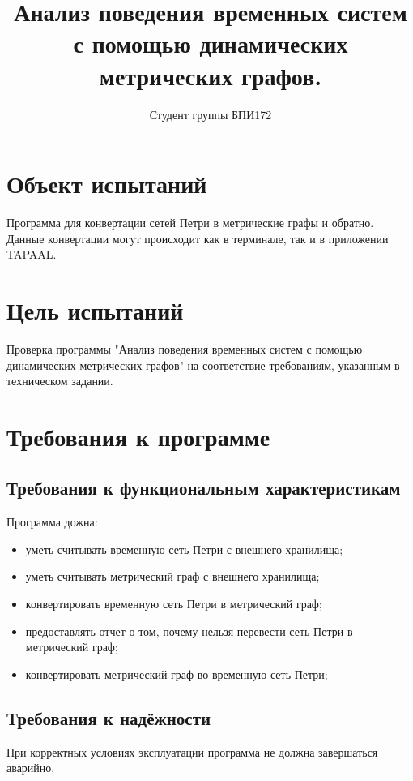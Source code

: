 \documentclass{../TechDoc}
\title{Анализ поведения временных систем с помощью динамических метрических графов.}
\author{Студент группы БПИ172}{А. А. Измайлов}
\begin{document}
	\maketitle
	\tableofcontents
	
	\section{Объект испытаний}
	Программа для конвертации сетей Петри в метрические графы и обратно. Данные конвертации могут происходит как в терминале, так и в приложении TAPAAL.
	
	\section{Цель испытаний}
	Проверка программы "Анализ поведения временных систем с помощью динамических метрических графов" на соответствие требованиям, указанным в техническом задании.
	
	\section{Требования к программе}
	\subsection{Требования к функциональным характеристикам}
	Программа дожна:
	\begin{itemize}
		\item уметь считывать временную сеть Петри с внешнего хранилища;
		\item уметь считывать метрический граф с внешнего хранилища;
		\item конвертировать временную сеть Петри в метрический граф;
		\item предоставлять отчет о том, почему нельзя перевести сеть Петри в метрический граф;
		\item конвертировать метрический граф во временную сеть Петри;
	\end{itemize}
	\subsection{Требования к надёжности}
	При корректных условиях эксплуатации программа не должна завершаться аварийно.
	
\end{document}
